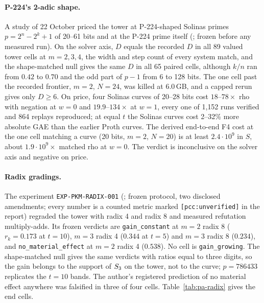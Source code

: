 \paragraph{P-224's 2-adic shape.} A study of 22 October priced the tower at
P-224-shaped Solinas primes $p=2^n-2^k+1$ of 20--61 bits and at the P-224
prime itself (; frozen
before any measured run). On the solver axis, $D$ equals the recorded $D$
in all 89 valued tower cells at $m=2,3,4$, the width and step count of
every system match, and the shape-matched null gives the same $D$ in all 65
paired cells, although $k/n$ ran from $0.42$ to $0.70$ and the odd part of
$p-1$ from 6 to 128 bits. The one cell past the recorded frontier,
$m=2$, $N=24$, was killed at 6.0\,GB, and a capped rerun gives only $D\ge6$.
On price, four Solinas curves of 20--28 bits cost $18$--$78\times$ rho with
negation at $w=0$ and $19.9$--$134\times$ at $w=1$, every one of 1{,}152 runs
verified and 864 replays reproduced; at equal $t$ the Solinas curves cost
2--32\% more absolute GAE than the earlier Proth curves. The derived
end-to-end F4 cost at the one cell matching a curve (20 bits, $m=2$,
$N=20$) is at least $2.4\cdot10^9$ in $S$, about $1.9\cdot10^9\times$
matched rho at $w=0$. The verdict is inconclusive on the solver axis and
negative on price.

\paragraph{Radix gradings.} The experiment \texttt{EXP-PKM-RADIX-001}
(; frozen protocol, two
disclosed amendments; every number is a counted metric marked
\texttt{[pcc:unverified]} in the report) regraded the tower with radix 4 and
radix 8 and measured refutation multiply-adds. Its frozen verdicts are
\texttt{gain\_constant} at $m=2$ radix 8 ($r_k=0.173$ at $t=10$), $m=3$
radix 4 ($0.344$ at $t=5$) and $m=3$ radix 8 ($0.234$), and
\texttt{no\_material\_effect} at $m=2$ radix 4 ($0.538$). No cell is
\texttt{gain\_growing}. The shape-matched null gives the same verdicts with
ratios equal to three digits, so the gain belongs to the support of $S_{3}$
on the tower, not to the curve; $p=786433$ replicates the $t=10$ bands. The
author's registered prediction of no material effect anywhere was
falsified in three of four cells. Table~\ref{tab:pa-radix} gives the end cells.

